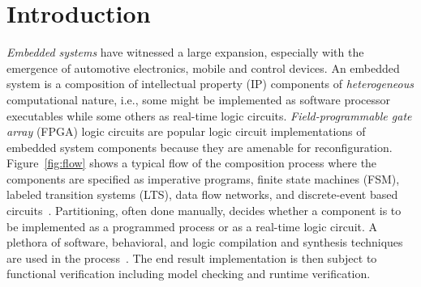 \section{Introduction}
\label{sect-intro}

\begin{figure*}
\resizebox{1.9\columnwidth}{!}{
  
}
\caption{Embedded system specification, refinement, and implementation stages}
\label{fig:flow}
\end{figure*}

\emph{Embedded systems} have witnessed a large 
expansion, especially with  the emergence of automotive 
electronics, mobile and control devices.
%
An embedded system is a composition of intellectual property (IP) components
of \emph{heterogeneous} computational nature, i.e., some might be implemented as software 
processor executables while some others as real-time logic circuits. 
\emph{Field-programmable gate array} (FPGA) logic circuits are popular logic circuit 
implementations of 
embedded system components because they are amenable for reconfiguration. 
%
Figure~\ref{fig:flow} shows a typical flow of the composition process where the
components are specified as imperative programs, finite state machines (FSM), labeled 
transition systems (LTS), data flow networks, and discrete-event based circuits~\cite{henzinger2006embedded}.
Partitioning, often done manually, decides whether a component is to 
be implemented as a programmed process or as a real-time logic circuit. 
A plethora of software, behavioral, and logic compilation and synthesis techniques are
used in the process~\cite{metropolis2}.
The end result implementation is then subject to functional verification including 
model checking and runtime verification. 

